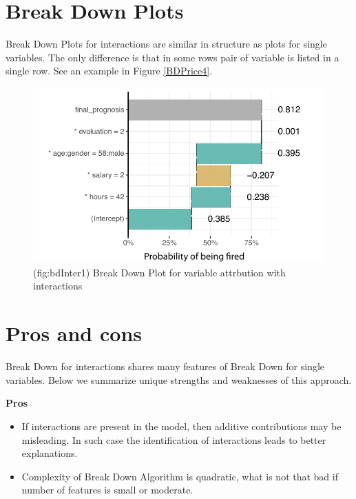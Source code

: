 \documentclass[]{book}
\providecommand{\tightlist}{%
  \setlength{\itemsep}{0pt}\setlength{\parskip}{0pt}}
\theoremstyle{definition}
\theoremstyle{definition}
\theoremstyle{definition}
\theoremstyle{remark}
\begin{document}
\hypertarget{break-down-plots-1}{%
\section{Break Down Plots}\label{break-down-plots-1}}

Break Down Plots for interactions are similar in structure as plots for
single variables. The only difference is that in some rows pair of
variable is listed in a single row. See an example in Figure
\ref{BDPrice4}.

\begin{figure}

{\centering \includegraphics[width=0.7\linewidth]{figure/bd_inter_1} 

}

\caption{(fig:bdInter1) Break Down Plot for variable attrbution with interactions }\label{fig:bdInter1}
\end{figure}

\hypertarget{pros-and-cons-1}{%
\section{Pros and cons}\label{pros-and-cons-1}}

Break Down for interactions shares many features of Break Down for
single variables. Below we summarize unique strengths and weaknesses of
this approach.

\textbf{Pros}

\begin{itemize}
\tightlist
\item
  If interactions are present in the model, then additive contributions
  may be misleading. In such case the identification of interactions
  leads to better explanations.
\item
  Complexity of Break Down Algorithm is quadratic, what is not that bad
  if number of features is small or moderate.
\end{itemize}
\end{document}
